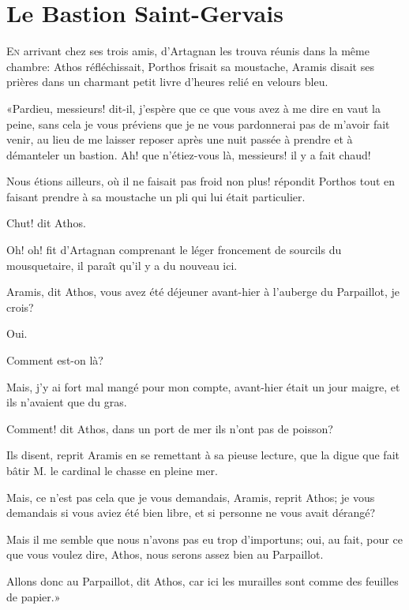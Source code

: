 
\chapter{Le Bastion Saint-Gervais}

\lettrine{E}{n} arrivant chez ses trois amis, d'Artagnan les trouva réunis dans la même chambre: Athos réfléchissait, Porthos frisait sa moustache, Aramis disait ses prières dans un charmant petit livre d'heures relié en velours bleu. 

«Pardieu, messieurs! dit-il, j'espère que ce que vous avez à me dire en vaut la peine, sans cela je vous préviens que je ne vous pardonnerai pas de m'avoir fait venir, au lieu de me laisser reposer après une nuit passée à prendre et à démanteler un bastion. Ah! que n'étiez-vous là, messieurs! il y a fait chaud! 

\speak  Nous étions ailleurs, où il ne faisait pas froid non plus! répondit Porthos tout en faisant prendre à sa moustache un pli qui lui était particulier. 

\speak  Chut! dit Athos. 

\speak  Oh! oh! fit d'Artagnan comprenant le léger froncement de sourcils du mousquetaire, il paraît qu'il y a du nouveau ici. 

\speak  Aramis, dit Athos, vous avez été déjeuner avant-hier à l'auberge du Parpaillot, je crois? 

\speak  Oui. 

\speak  Comment est-on là? 

\speak  Mais, j'y ai fort mal mangé pour mon compte, avant-hier était un jour maigre, et ils n'avaient que du gras. 

\speak  Comment! dit Athos, dans un port de mer ils n'ont pas de poisson? 

\speak  Ils disent, reprit Aramis en se remettant à sa pieuse lecture, que la digue que fait bâtir M. le cardinal le chasse en pleine mer. 

\speak  Mais, ce n'est pas cela que je vous demandais, Aramis, reprit Athos; je vous demandais si vous aviez été bien libre, et si personne ne vous avait dérangé? 

\speak  Mais il me semble que nous n'avons pas eu trop d'importuns; oui, au fait, pour ce que vous voulez dire, Athos, nous serons assez bien au Parpaillot. 

\speak  Allons donc au Parpaillot, dit Athos, car ici les murailles sont comme des feuilles de papier.» 

